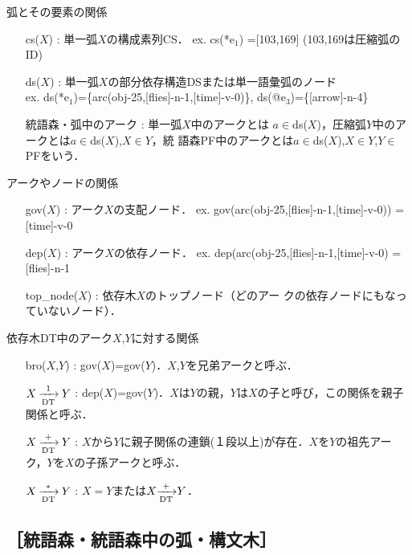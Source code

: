 \myhalfskip
\hspace{-5mm}
\fbox
{
 \begin{minipage}{13.7cm}

弧とその要素の関係

\begin{itemize}
\item[\myitemindent cs($X$)] : 単一弧$X$の構成素列CS． ex. cs(*e$_1$) =[103,169] (103,169は圧縮弧のID)
\item[\myitemindent ds($X$)] : 単一弧$X$の部分依存構造DSまたは単一語彙弧のノード\\
ex. ds(*e$_1$)=\{arc(obj-25,[flies]-n-1,[time]-v-0)\}, ds(@e$_3$)=\{[arrow]-n-4\}
\item[\myitemindent 統語森・弧中のアーク] : 単一弧$X$中のアークとは
$a{\in}$ds($X$)，圧縮弧$Y$中のアークとは$a{\in}$ds($X$),$X{\in}Y$，統
語森PF中のアークとは$a{\in}$ds($X$),$X{\in}Y$,$Y{\in}$PFをいう．
\end{itemize}

アークやノードの関係
\begin{itemize}
\item[\myitemindent gov($X$)] : アーク$X$の支配ノード． ex. gov(arc(obj-25,[flies]-n-1,[time]-v-0)) = [time]-v-0
\item[\myitemindent dep($X$)] : アーク$X$の依存ノード． ex. dep(arc(obj-25,[flies]-n-1,[time]-v-0) = [flies]-n-1
\item[\myitemindent top\_node($X$)] : 依存木$X$のトップノード（どのアー
クの依存ノードにもなっていないノード）．
\end{itemize}

依存木DT中のアーク$X$,$Y$に対する関係
\begin{itemize}
\item[\myitemindent bro($X$,$Y$)] : gov($X$)=gov($Y$)．$X$,$Y$を兄弟アークと呼ぶ．
\item[\myitemindent $X \: {\xrightarrow[{\rm DT}]{1}} \: Y$] : dep($X$)=gov($Y$)．$X$は$Y$の親，$Y$は$X$の子と呼び，この関係を親子関係と呼ぶ．
\item[\myitemindent $X \: {\xrightarrow[{\rm DT}]{+}} \: Y$] : $X$から$Y$に親子関係の連鎖(１段以上)が存在．$X$を$Y$の祖先アーク，$Y$を$X$の子孫アークと呼ぶ．
\item[\myitemindent $X \: {\xrightarrow[{\rm DT}]{*}} \: Y$] : $X=Y$または$X{\xrightarrow[{\rm DT}]{+}}Y$．
\end{itemize}
\myhalfskip
\end{minipage}
}

\subsection*{［統語森・統語森中の弧・構文木］}

